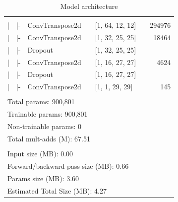 \begin{table}[!htpb]
{\begin{tabular}{lrllllr}
           &
           \\
        |           & |-                             & ConvTranspose2d &  & [1, 64, 12, 12] &  & 294976 \\
        |           & |-                             & ConvTranspose2d &  & [1, 32, 25, 25] &  & 18464  \\
        |           & |-                             & Dropout         &  & [1, 32, 25, 25] &  &        \\
        |           & |-                             & ConvTranspose2d &  & [1, 16, 27, 27] &  & 4624   \\
        |           & |-                             & Dropout         &  & [1, 16, 27, 27] &  &        \\
        |           & |-                             & ConvTranspose2d &  & [1, 1, 29, 29]  &  & 145    \\ \hline
                    & \multicolumn{1}{l}{}           &                 &  &                 &  &        \\ \hline
        \multicolumn{7}{l}{Total params: 900,801}                                                       \\
        \multicolumn{7}{l}{Trainable params: 900,801}                                                   \\
        \multicolumn{7}{l}{Non-trainable params: 0}                                                     \\
        \multicolumn{7}{l}{Total mult-adds (M): 67.51}                                                  \\ \hline
                    & \multicolumn{1}{l}{}           &                 &  &                 &  &        \\ \hline
        \multicolumn{7}{l}{Input size (MB): 0.00}                                                       \\
        \multicolumn{7}{l}{Forward/backward pass size (MB): 0.66}                                       \\
        \multicolumn{7}{l}{Params size (MB): 3.60}                                                      \\
        \multicolumn{7}{l}{Estimated Total Size (MB): 4.27}                                             \\ \hline
        \end{tabular}%
        }
        \caption{Model architecture}
        \label{tab:model}
        \end{table}
    
